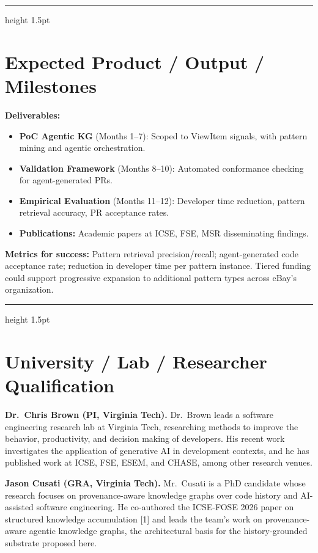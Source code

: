 \documentclass[11pt, letterpaper]{article}
\newcommand{\ehr}{{\color{gray!60}\hrule height 1.5pt}}
\begin{document}
\ehr

\section*{Expected Product / Output / Milestones}
\label{sec:output}

\textbf{Deliverables:}
\begin{itemize}
    \item \textbf{PoC Agentic KG} (Months 1--7): Scoped to ViewItem signals, with pattern mining and agentic orchestration.
    \item \textbf{Validation Framework} (Months 8--10): Automated conformance checking for agent-generated PRs.
    \item \textbf{Empirical Evaluation} (Months 11--12): Developer time reduction, pattern retrieval accuracy, PR acceptance rates.
    \item \textbf{Publications:} Academic papers at ICSE, FSE, MSR disseminating findings.
\end{itemize}

\textbf{Metrics for success:} Pattern retrieval precision/recall; agent-generated code acceptance rate; reduction in developer time per pattern instance. Tiered funding could support progressive expansion to additional pattern types across eBay's organization.

\ehr

\section*{University / Lab / Researcher Qualification}
\label{sec:qualification}

\textbf{Dr.~Chris Brown (PI, Virginia Tech).} Dr.~Brown leads a software engineering research lab at Virginia Tech, researching methods to improve the behavior, productivity, and decision making of developers. His recent work investigates the application of generative AI in development contexts, and he has published work at ICSE, FSE, ESEM, and CHASE, among other research venues.

\textbf{Jason Cusati (GRA, Virginia Tech).} Mr.~Cusati is a PhD candidate whose research focuses on provenance-aware knowledge graphs over code history and AI-assisted software engineering. He co-authored the ICSE-FOSE 2026 paper on structured knowledge accumulation [1] and leads the team's work on provenance-aware agentic knowledge graphs, the architectural basis for the history-grounded substrate proposed here.
\end{document}
